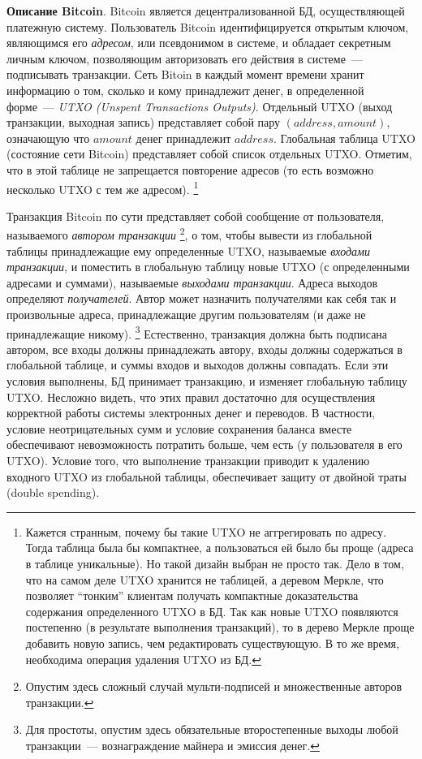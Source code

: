 \documentclass{article}
\begin{document}
{\bf Описание Bitcoin}.
Bitcoin является децентрализованной БД, осуществляющей платежную систему.
Пользователь Bitcoin идентифицируется открытым ключом, являющимся его \textit{адресом}, или псевдонимом в системе,
и обладает секретным личным ключом, позволяющим авторизовать его действия в системе~--- подписывать транзакции.
Сеть Bitoin в каждый момент времени хранит информацию о том, сколько и кому принадлежит денег,
в определенной форме~--- \textit{UTXO (Unspent Transactions Outputs)}.
Отдельный UTXO (выход транзакции, выходная запись) представляет собой пару $(address, amount)$,
означающую что $amount$ денег принадлежит $address$.
Глобальная таблица UTXO (состояние сети Bitcoin) представляет собой список отдельных UTXO.
Отметим, что в этой таблице не запрещается повторение адресов (то есть возможно несколько UTXO с тем же адресом).
\footnote{Кажется странным, почему бы такие UTXO не аггрегировать по адресу.
Тогда таблица была бы компактнее,
а пользоваться ей было бы проще (адреса в таблице уникальные). Но такой дизайн выбран не просто так.
Дело в том, что на самом деле UTXO хранится не таблицей, а деревом Меркле,
что позволяет ``тонким'' клиентам
получать компактные доказательства содержания определенного UTXO в БД.
Так как новые UTXO появляются постепенно (в результате выполнения транзакций),
то в дерево Меркле проще добавить новую запись, чем редактировать существующую.
В то же время, необходима операция удаления UTXO из БД.}

Транзакция Bitcoin по сути представляет собой сообщение от пользователя,
называемого \textit{автором транзакции}
\footnote{Опустим здесь сложный случай мульти-подписей и множественные авторов транзакции.},
о том, чтобы вывести из глобальной таблицы принадлежащие ему определенные UTXO,
называемые \textit{входами транзакции},
и поместить в глобальную таблицу новые UTXO (с определенными адресами и суммами),
называемые \textit{выходами транзакции}.
Адреса выходов определяют \textit{получателей}. Автор может назначить получателями
как себя так и произвольные адреса, принадлежащие другим пользователям (и
даже не принадлежащие никому).
\footnote{Для простоты, опустим здесь обязательные второстепенные выходы любой транзакции~---
вознаграждение майнера и эмиссия денег.}
Естественно, транзакция должна быть подписана автором,
все входы должны принадлежать автору, входы должны содержаться в глобальной таблице,
 и суммы входов и выходов должны совпадать.
Если эти условия выполнены, БД принимает транзакцию, и изменяет глобальную таблицу UTXO.
Несложно видеть, что этих правил достаточно для осуществления корректной работы
системы электронных денег и переводов. В частности, условие неотрицательных сумм и
условие сохранения баланса вместе обеспечивают невозможность потратить больше,
чем есть (у пользователя в его UTXO).
Условие того, что выполнение транзакции приводит к удалению входного UTXO
из глобальной таблицы, обеспечивает защиту от двойной траты (double spending).
\end{document}
